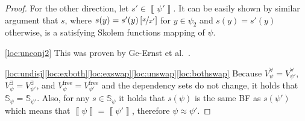 \documentclass[
  digital, %
  color,
  twoside, %
  table,   %
  nolof,     %
  nolot,     %
]{fithesis3}
\theoremstyle{definition}
\theoremstyle{remark}
\newcommand{\seman}[1]{\left\llbracket {#1} \right\rrbracket}
\newcommand{\substitute}[2]{\left[ \nicefrac{#2}{#1} \right]}
\newcommand{\evars}[1]{V_{#1}^{\exists}}
\newcommand{\uvars}[1]{V_{#1}^{\forall}}
\newcommand{\fvars}[1]{V_{#1}^{\mathrm{free}}}
\newcommand{\Scands}[1]{\mathbb{S}_{#1}}
\begin{document}
\begin{proof}
  For the other direction, let $s' \in \seman{\psi'}$. It can be easily shown by similar argument that $s$, where $s(y) = s'(y)\substitute{x'}{x}$ for $y \in \psi_2$ and $s(y) = s'(y)$ otherwise, is a satisfying Skolem functions mapping of $\psi$.
  
  \eqref{loc:unconj2} This was proven by Ge-Ernst et al.~\cite[Theorem 4]{HQSquantifierLocalisation}.
  
  
  \eqref{loc:undisj}\eqref{loc:exboth}\eqref{loc:exswap}\eqref{loc:unswap}\eqref{loc:bothswap} Because $\uvars{\psi} = \uvars{\psi'}$, $\evars{\psi} = \evars{\psi'}$, and $\fvars{\psi} = \fvars{\psi'}$ and the dependency sets do not change, it holds that $\Scands{\psi} = \Scands{\psi'}$. Also, for any $s \in \Scands{\psi}$ it holds that $s(\psi)$ is the same BF as $s(\psi')$ which means that $\seman{\psi} = \seman{\psi'}$, therefore $\psi \approx \psi'$.
\end{proof}
\end{document}
